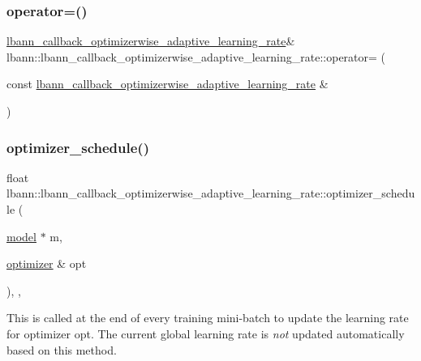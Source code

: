 \subsubsection{\texorpdfstring{operator=()}{operator=()}}
{\footnotesize\ttfamily \hyperlink{classlbann_1_1lbann__callback__optimizerwise__adaptive__learning__rate}{lbann\+\_\+callback\+\_\+optimizerwise\+\_\+adaptive\+\_\+learning\+\_\+rate}\& lbann\+::lbann\+\_\+callback\+\_\+optimizerwise\+\_\+adaptive\+\_\+learning\+\_\+rate\+::operator= (\begin{DoxyParamCaption}\item[{const \hyperlink{classlbann_1_1lbann__callback__optimizerwise__adaptive__learning__rate}{lbann\+\_\+callback\+\_\+optimizerwise\+\_\+adaptive\+\_\+learning\+\_\+rate} \&}]{ }\end{DoxyParamCaption})\hspace{0.3cm}{\ttfamily [default]}}

\mbox{\label{classlbann_1_1lbann__callback__optimizerwise__adaptive__learning__rate_aa9ce00b0ad1fefb20a1108d1120e82d5}} 
\subsubsection{\texorpdfstring{optimizer\+\_\+schedule()}{optimizer\_schedule()}}
{\footnotesize\ttfamily float lbann\+::lbann\+\_\+callback\+\_\+optimizerwise\+\_\+adaptive\+\_\+learning\+\_\+rate\+::optimizer\+\_\+schedule (\begin{DoxyParamCaption}\item[{\hyperlink{classlbann_1_1model}{model} $\ast$}]{m,  }\item[{\hyperlink{classlbann_1_1optimizer}{optimizer} \&}]{opt }\end{DoxyParamCaption})\hspace{0.3cm}{\ttfamily [override]}, {\ttfamily [protected]}, {\ttfamily [virtual]}}

This is called at the end of every training mini-\/batch to update the learning rate for optimizer opt. The current global learning rate is {\itshape not} updated automatically based on this method. 

